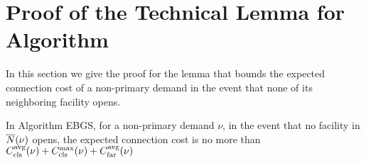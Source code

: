 \documentclass[11pt]{article}
\begin{document}




\appendix
\section{Proof of the Technical Lemma for Algorithm {\EBGS}}\label{app:EBGS connection cost}
In this section we give the proof for the lemma that bounds the
expected connection cost of a non-primary demand in the event that
none of its neighboring facility opens.
\begin{lemma}\label{lem: EBGS target connection cost}
  In Algorithm EBGS, for a non-primary demand $\nu$, in the event that
  no facility in ${\overline{N}}(\nu)$ opens, the expected connection cost is
  no more than $C_{\text{cls}}^{{\mbox{\scriptsize\rm avg}}}(\nu)+C_{\text{cls}}^{\max}(\nu)+C_{\text{far}}^{{\mbox{\scriptsize\rm avg}}}(\nu)$
\end{lemma}
\end{document}

